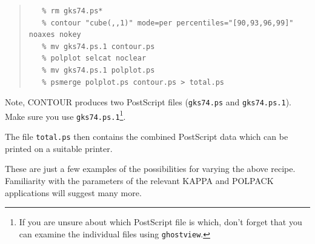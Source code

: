 \documentclass[twoside,11pt]{article}
\renewcommand{\_}{\texttt{\symbol{95}}}
\newenvironment{myquote}{\begin{quote}\begin{small}}{\end{small}\end{quote}}
\begin{document}
\begin{itemize}
\begin{myquote}
\begin{verbatim}
   % rm gks74.ps*
   % contour "cube(,,1)" mode=per percentiles="[90,93,96,99]" noaxes nokey
   % mv gks74.ps.1 contour.ps
   % polplot selcat noclear 
   % mv gks74.ps.1 polplot.ps
   % psmerge polplot.ps contour.ps > total.ps
\end{verbatim}
\end{myquote}

Note, CONTOUR produces two PostScript files (\verb+gks74.ps+ and
\verb+gks74.ps.1+). Make sure you use \verb+gks74.ps.1+\footnote{If you are
unsure about which PostScript file is which, don't forget that you can
examine the individual files using \texttt{ghostview}.}.

The file \verb+total.ps+ then  contains the combined PostScript data
which can be printed on a suitable printer.

\end{itemize}

These are just a few examples of the possibilities for varying the above
recipe. Familiarity with the parameters of the relevant KAPPA and POLPACK
applications will suggest many more.
\end{document}
